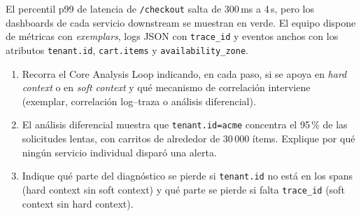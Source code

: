 \documentclass[variant=guia,cover=institutional,mode=screen]{ua-engineering-v6-article}
\begin{document}
\begin{uaexercise}
El percentil p99 de latencia de \texttt{/checkout} salta de 300\,ms a 4\,s, pero los dashboards de cada servicio downstream se muestran en verde. El equipo dispone de métricas con \emph{exemplars}, logs JSON con \texttt{trace\_id} y eventos anchos con los atributos \texttt{tenant.id}, \texttt{cart.items} y \texttt{availability\_zone}.
\begin{enumerate}
\item Recorra el Core Analysis Loop indicando, en cada paso, si se apoya en \emph{hard context} o en \emph{soft context} y qué mecanismo de correlación interviene (exemplar, correlación log--traza o análisis diferencial).
\item El análisis diferencial muestra que \texttt{tenant.id=acme} concentra el 95\,\% de las solicitudes lentas, con carritos de alrededor de 30\,000 ítems. Explique por qué ningún servicio individual disparó una alerta.
\item Indique qué parte del diagnóstico se pierde si \texttt{tenant.id} no está en los spans (hard context sin soft context) y qué parte se pierde si falta \texttt{trace\_id} (soft context sin hard context).
\end{enumerate}
\end{uaexercise}
\end{document}
